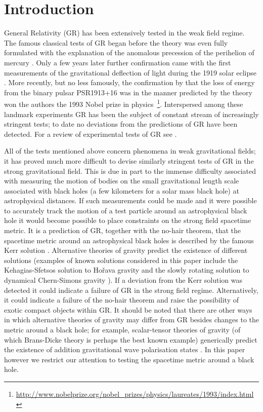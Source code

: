 \section{Introduction}
General Relativity (GR) has been extensively tested in the weak field regime. The famous classical tests of GR began before the theory was even fully formulated with the explanation of the anomalous precession of the perihelion of mercury \cite{1915SPAW.......831E}. Only a few years later further confirmation came with the first measurements of the gravitational deflection of light during the 1919 solar eclipse \citep{1920RSPTA.220..291D}. More recently, but no less famously, the confirmation by \cite{1975ApJ...195L..51H} that the loss of energy from the binary pulsar PSR1913+16 was in the manner predicted by the theory won the authors the 1993 Nobel prize in physics~\footnote{\url{http://www.nobelprize.org/nobel_prizes/physics/laureates/1993/index.html}}. Interspersed among these landmark experiments GR has been the subject of constant stream of increasingly stringent tests; to date no deviations from the predictions of GR have been detected. For a review of experimental tests of GR see \cite{lrr-2006-3}. 

All of the tests mentioned above concern phenomena in weak gravitational fields; it has proved much more difficult to devise similarly stringent tests of GR in the strong gravitational field. This is due in part to the immense difficulty associated with measuring the motion of bodies on the small gravitational length scale associated with black holes (a few kilometers for a solar mass black hole) at astrophysical distances. If such measurements could be made and it were possible to accurately track the motion of a test particle around an astrophysical black hole it would become possible to place constraints on the strong field spacetime metric. It is a prediction of GR, together with the no-hair theorem, that the spacetime metric around an astrophysical black holes is described by the famous Kerr solution \citep{PhysRevLett.11.237}. Alternative theories of gravity predict the existence of different solutions (examples of known solutions considered in this paper include the Kehagias-Sfetsos solution \citep{2009PhLB..678..123K} to Ho\v{r}ava gravity \citep{2009PhRvL.102p1301H,2009PhRvD..79h4008H} and the slowly rotating solution \citep{2009PhRvD..79h4043Y} to dynamical Chern-Simons gravity \citep{2003PhRvD..68j4012J}). If a deviation from the Kerr solution was detected it could indicate a failure of GR in the strong field regime. Alternatively, it could indicate a failure of the no-hair theorem and raise the possibility of exotic compact objects within GR. It should be noted that there are other ways in which alternative theories of gravity may differ from GR besides changes to the metric around a black hole; for example, scalar-tensor theories of gravity (of which Brans-Dicke theory \citep{PhysRev.124.925} is perhaps the best known example) generically predict the existence of addition gravitational wave polarisation states \citep{lrr-2006-3}. In this paper however we restrict our attention to testing the spacetime metric around a black hole.

